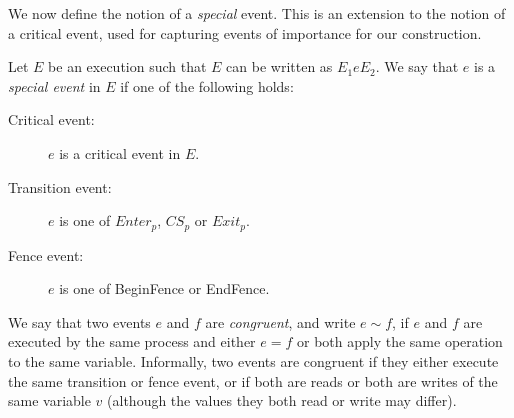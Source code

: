 We now define the notion of a \emph{special} event. This is an extension to the notion of a critical event, used for capturing events of importance for our construction.

\begin{definition}
	Let $E$ be an execution such that $E$ can be written as $E_1 e E_2$. We say that $e$ is a \emph{special event} in $E$ if one of the following holds:
	\begin{description}
		\item[Critical event:] $e$ is a critical event in $E$.
		\item[Transition event:] $e$ is one of $Enter_p$, $CS_p$ or $Exit_p$.
		\item[Fence event:] $e$ is one of BeginFence or EndFence.
	\end{description}
\end{definition}


We say that two events $e$ and $f$ are \emph{congruent}, and write $e \sim f$, if $e$ and $f$ are executed by the same process and either $e = f$ or both apply the same operation to the same variable.
Informally, two events are congruent if they either execute the same transition or fence event, or if both are reads or both are writes of the same variable $v$ (although the values they both read or write may differ).

\begin{comment}%
As a special event depends only on the prefix of the execution preceding it, the type of operation, and the remote variable it accesses (if any), we have:
\begin{fact}
	Let $E=E_1 e E_2$ be an execution fragment, where $e$ is a special event in $E$. Then for any $f \sim e$, $f$ is a special event in $E_1 f E_2$.
\end{fact}
\end{comment}
